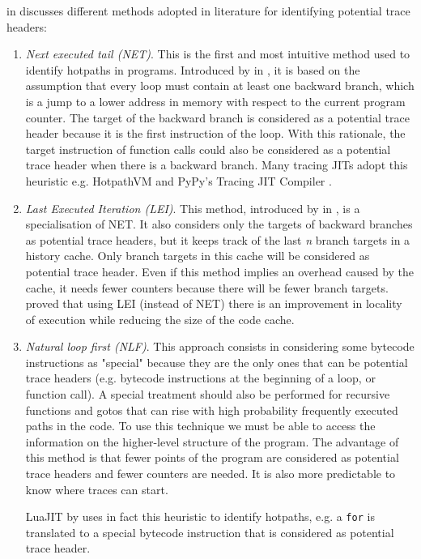 \citeauthor{schilling2013trace} in \cite{schilling2013trace} discusses different methods adopted in literature for identifying potential trace headers:

\begin{enumerate}
    \item \textit{Next executed tail (NET)}. This is the first and most intuitive method used to identify hotpaths in programs. Introduced by \citeauthor{bala1999transparent} in \cite{bala1999transparent, duesterwald2000software}, it is based on the assumption that every loop must contain at least one backward branch, which is a jump to a lower address in memory with respect to the current program counter. The target of the backward branch is considered as a potential trace header because it is the first instruction of the loop. With this rationale, the target instruction of function calls could also be considered as a potential trace header when there is a backward branch. Many tracing JITs adopt this heuristic e.g. HotpathVM \cite{gal2006hotpathvm} and PyPy’s Tracing JIT Compiler \cite{bolz2009tracing}.
    
    \item \textit{Last Executed Iteration (LEI)}. This method, introduced by \citeauthor{hiniker2005improving} in \cite{hiniker2005improving}, is a specialisation of NET. It also considers only the targets of backward branches as potential trace headers, but it keeps track of the last \textit{n} branch targets in a history cache. Only branch targets in this cache will be considered as potential trace header. Even if this method implies an overhead caused by the cache, it needs fewer counters because there will be fewer branch targets. \citeauthor{hiniker2005improving} proved that using LEI (instead of NET) there is an improvement in locality of execution while reducing the size of the code cache.
    
    \item \textit{Natural loop first (NLF)}. This approach consists in considering some bytecode instructions as "special" because they are the only ones that can be potential trace headers (e.g. bytecode instructions at the beginning of a loop, or function call). A special treatment should also be performed for recursive functions and gotos that can rise with high probability frequently executed paths in the code. To use this technique we must be able to access the information on the higher-level structure of the program. The advantage of this method is that fewer points of the program are considered as potential trace headers and fewer counters are needed. It is also more predictable to know where traces can start.
    
    LuaJIT \cite{pall2012luajit} by \citeauthor{pall2012luajit} uses in fact this heuristic to identify hotpaths, e.g. a \texttt{for} is translated to a special bytecode instruction that is considered as potential trace header.
    
\end{enumerate}

